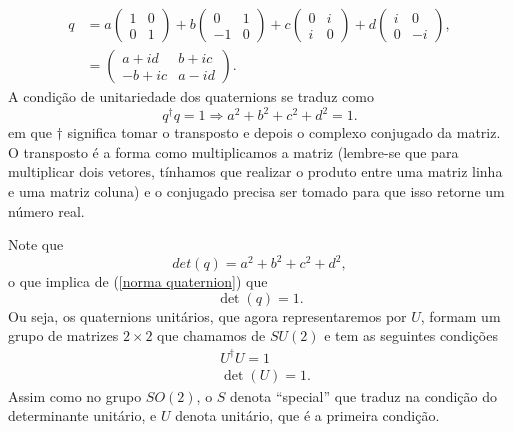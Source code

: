 \documentclass{article}
\numberwithin{equation}{section}
\numberwithin{figure}{section}
\begin{document}
\begin{equation}
\begin{split}
		q&=a\begin{pmatrix}
		1 & 0 \\
		0 & 1
	\end{pmatrix}+b\begin{pmatrix}
		0 & 1 \\
		-1 & 0
	\end{pmatrix}+c\begin{pmatrix}
		0 & i \\
		i & 0
	\end{pmatrix}+d\begin{pmatrix}
		i & 0 \\
		0 & -i
	\end{pmatrix},\\&=\begin{pmatrix}
	a+id & b+ic \\
	-b+ic & a-id
	\end{pmatrix}.
\end{split}
\end{equation}
A condição de unitariedade dos quaternions se traduz como 
\begin{equation}\label{norma quaternion}
	q^{\dagger}q=1\Rightarrow a^2+b^2+c^2+d^2=1.
\end{equation}
em que $\dagger$ significa tomar o transposto e depois o complexo conjugado da matriz. O transposto é a forma como multiplicamos a matriz (lembre-se que para multiplicar dois vetores, tínhamos que realizar o produto entre uma matriz linha e uma matriz coluna) e o conjugado precisa ser tomado para que isso retorne um número real. 

Note que 
\begin{equation}
	det(q)=a^2+b^2+c^2+d^2,
\end{equation}
o que implica de (\ref{norma quaternion}) que
\begin{equation}
	\det(q)=1.
\end{equation}
 Ou seja, os quaternions unitários, que agora representaremos por $U$, formam um grupo de matrizes $2\times 2$ que chamamos de $SU(2)$ e tem as seguintes condições 
\begin{equation}
\begin{split}
	&U^{\dagger}U=1\\
	&\det(U)=1. 
\end{split}
\end{equation}
Assim como no grupo $SO(2)$, o $S$ denota ``special'' que traduz na condição do determinante unitário, e $U$ denota unitário, que é a primeira condição. 
\end{document}
